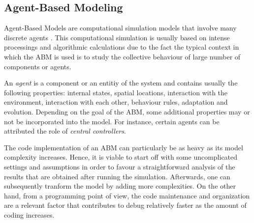 \subsection{Agent-Based Modeling}
Agent-Based Models are computational simulation models that involve many discrete agents \cite{ago2019abm}. This computational simulation is usually based on intense processings and algorithmic calculations due to the fact the typical context in which the ABM is used is to study the collective behaviour of large number of components or agents.

An \emph{agent} is a component or an entitiy of the system and contains usually the following properties: internal states, spatial locations, interaction with the environment, interaction with each other, behaviour rules, adaptation and evolution. Depending on the goal of the ABM, some additional properties may or not be incorporated into the model. For instance, certain agents can be attributed the role of \emph{central controllers}.

The code implementation of an ABM can particularly be as heavy as its model complexity increases. Hence, it is viable to start off with some uncomplicated settings and assumptions in order to favour a straightforward analysis of the results that are obtained after running the simulation. Afterwards, one can subsequently tranform the model by adding more complexities. On the other hand, from a programming point of view, the code maintenance and organization are a relevant factor that contributes to debug relatively faster as the amount of coding increases.

